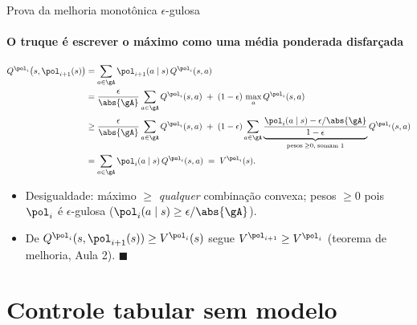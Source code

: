 \documentclass[aspectratio=169, 11pt]{beamer}
\begin{document}
\begin{frame}{Prova da melhoria monotônica $\epsilon$-gulosa}
  \framesubtitle{O truque é escrever o máximo como uma média ponderada disfarçada}

  {\footnotesize
  \begin{align*}
    Q^{\pol_i}\bigl(s, \pol_{i+1}(s)\bigr)
      &= \sum_{a \in \gA} \pol_{i+1}(a\mid s)\, Q^{\pol_i}(s,a) \\
      &= \frac{\epsilon}{\abs{\gA}} \sum_{a \in \gA} Q^{\pol_i}(s,a)
         \;+\; (1-\epsilon)\, \max_{a} Q^{\pol_i}(s,a) \\[0.4ex]
      &\ge \frac{\epsilon}{\abs{\gA}} \sum_{a \in \gA} Q^{\pol_i}(s,a)
         \;+\; (1-\epsilon) \sum_{a \in \gA}
           \underbrace{\frac{\pol_i(a\mid s) - \epsilon/\abs{\gA}}{1-\epsilon}}_{\text{pesos} \;\ge 0,\; \text{somam } 1}
           Q^{\pol_i}(s,a) \\[0.4ex]
      &= \sum_{a \in \gA} \pol_i(a \mid s)\, Q^{\pol_i}(s,a) \;=\; V^{\pol_i}(s).
  \end{align*}}

  \vspace{-0.5em}
  \begin{itemize}\setlength{\itemsep}{0.2ex}
    \item[] {\footnotesize Desigualdade: máximo $\ge$ \emph{qualquer}
      combinação convexa; pesos $\ge 0$ pois $\pol_i$ é $\epsilon$-gulosa
      ($\pol_i(a\mid s) \ge \epsilon/\abs{\gA}$).}
    \item[] {\footnotesize De $Q^{\pol_i}(s,\pol_{i+1}(s)) \ge V^{\pol_i}(s)$
      segue $V^{\pol_{i+1}} \ge V^{\pol_i}$ (teorema de melhoria, Aula 2).
      \hfill $\blacksquare$}
  \end{itemize}
\end{frame}

\section{Controle tabular sem modelo}
\end{document}
